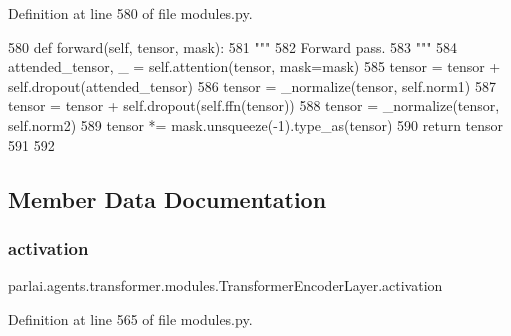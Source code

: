Definition at line 580 of file modules.\+py.


\begin{DoxyCode}
580     \textcolor{keyword}{def }forward(self, tensor, mask):
581         \textcolor{stringliteral}{"""}
582 \textcolor{stringliteral}{        Forward pass.}
583 \textcolor{stringliteral}{        """}
584         attended\_tensor, \_ = self.attention(tensor, mask=mask)
585         tensor = tensor + self.dropout(attended\_tensor)
586         tensor = \_normalize(tensor, self.norm1)
587         tensor = tensor + self.dropout(self.ffn(tensor))
588         tensor = \_normalize(tensor, self.norm2)
589         tensor *= mask.unsqueeze(-1).type\_as(tensor)
590         \textcolor{keywordflow}{return} tensor
591 
592 
\end{DoxyCode}


\subsection{Member Data Documentation}
\mbox{\label{classparlai_1_1agents_1_1transformer_1_1modules_1_1TransformerEncoderLayer_a2986c3841832cc56d76908347f22a0a3}} 
\subsubsection{\texorpdfstring{activation}{activation}}
{\footnotesize\ttfamily parlai.\+agents.\+transformer.\+modules.\+Transformer\+Encoder\+Layer.\+activation}



Definition at line 565 of file modules.\+py.

\mbox{\label{classparlai_1_1agents_1_1transformer_1_1modules_1_1TransformerEncoderLayer_ad8b0a3b903ca2595e72dd54f82f4dd9f}} 
